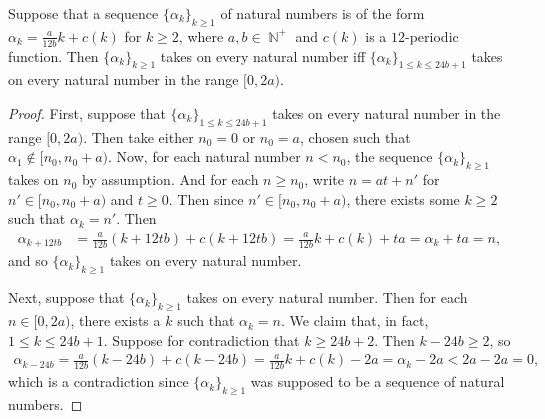 \documentclass[10pt,a4paper]{amsart}
\DeclareMathOperator{\NN}{\mathbb{N}}
\begin{document}
\begin{lemma} \label{lemma:k-periodic}
    Suppose that a sequence $\{\alpha_k\}_{k\ge1}$ of natural numbers is of the form $\displaystyle \alpha_k = \frac{a}{12b} k + c(k)$ for $k \ge 2$, where $a,b \in \NN^+$ and $c(k)$ is a $12$-periodic function. Then $\{\alpha_k\}_{k\ge1}$ takes on every natural number iff $\{\alpha_k\}_{1\le k \le 24b+1}$ takes on every natural number in the range $[0,2a)$.
\end{lemma}

\begin{proof}
    First, suppose that $\{\alpha_k\}_{1\le k \le 24b+1}$ takes on every natural number in the range $[0,2a)$. Then take either $n_0 = 0$ or $n_0 = a$, chosen such that $\alpha_1 \notin [n_0,n_0+a)$. Now, for each natural number $n < n_0$, the sequence $\{\alpha_k\}_{k\ge1}$ takes on $n_0$ by assumption. And for each $n \ge n_0$, write $n = at+n'$ for $n' \in [n_0,n_0+a)$ and $t \ge 0$. Then since $n' \in [n_0,n_0+a)$, there exists some $k \ge 2$ such that $\alpha_k = n'$. Then
    \begin{align}
        \alpha_{k+12tb} &= \frac{a}{12b}(k+12tb) + c(k+12tb) 
        = \frac{a}{12b}k+c(k) +ta 
        = \alpha_k + ta = n,
    \end{align}
    and so $\{\alpha_k\}_{k\ge1}$ takes on every natural number.

    Next, suppose that $\{\alpha_k\}_{k\ge1}$ takes on every natural number. Then for each $n \in [0,2a)$, there exists a $k$ such that $\alpha_k = n$. We claim that, in fact, $1 \le k \le 24b+1$. Suppose for contradiction that $k \ge 24b+2$. Then $k-24b \ge 2$, so
    \begin{align}
        \alpha_{k-24b} = \frac{a}{12b}(k-24b) + c(k-24b)  
        = \frac{a}{12b}k+c(k) - 2a 
        = \alpha_k - 2a < 2a - 2a = 0,
    \end{align}
    which is a contradiction since $\{\alpha_k\}_{k\ge1}$ was supposed to be a sequence of natural numbers.
\end{proof}
\end{document}

